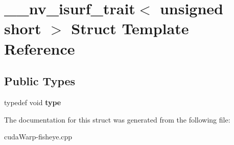 \hypertarget{struct____nv__isurf__trait_3_01unsigned_01short_01_4}{}\section{\+\_\+\+\_\+nv\+\_\+isurf\+\_\+trait$<$ unsigned short $>$ Struct Template Reference}
\label{struct____nv__isurf__trait_3_01unsigned_01short_01_4}
\subsection*{Public Types}
\begin{DoxyCompactItemize}
\item 
typedef void {\bfseries type}\hypertarget{struct____nv__isurf__trait_3_01unsigned_01short_01_4_acdbb37867f92f52c2b0e6c530a3ab261}{}\label{struct____nv__isurf__trait_3_01unsigned_01short_01_4_acdbb37867f92f52c2b0e6c530a3ab261}

\end{DoxyCompactItemize}


The documentation for this struct was generated from the following file\+:\begin{DoxyCompactItemize}
\item 
cuda\+Warp-\/fisheye.\+cpp\end{DoxyCompactItemize}
